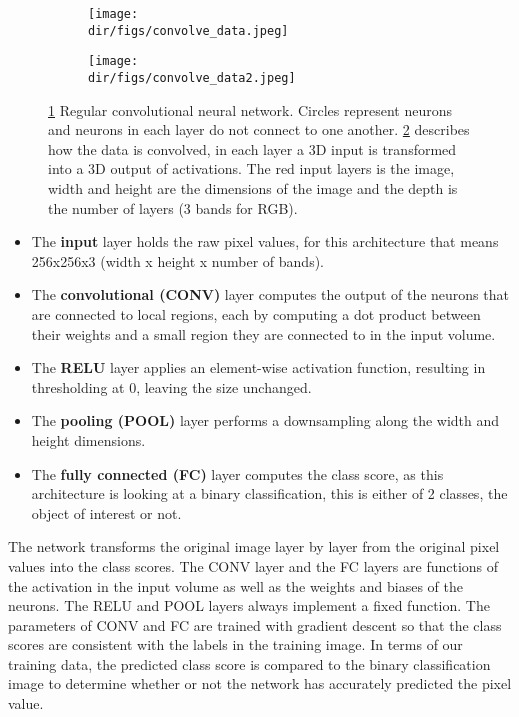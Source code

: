 \begin{figure}[H]
\centering
\begin{subfigure}{0.45\textwidth}
\texttt{[image: \\dir/figs/convolve\_data.jpeg]}
\caption{}
\label{fig.convolve_data1}
\end{subfigure}%
\qquad
\begin{subfigure}{0.45\textwidth}
\texttt{[image: \\dir/figs/convolve\_data2.jpeg]}
\caption{}
\label{fig.convolve_data2}
\end{subfigure}
\caption[Basic Convolutional Neural Network architecture]{\ref{fig.convolve_data1} Regular convolutional neural network. Circles represent neurons and neurons in each layer do not connect to one another. \ref{fig.convolve_data2} describes how the data is convolved, in each layer a 3D input is transformed into a 3D output of activations. The red input layers is the image, width and height are the dimensions of the image and the depth is the number of layers (3 bands for RGB).}
\label{fig.convolve_data}
\end{figure}

\begin{itemize}
    
    \item The \textbf{input} layer holds the raw pixel values, for this architecture that means 256x256x3 (width x height x number of bands).
    \item The \textbf{convolutional (CONV)} layer computes the output of the neurons that are connected to local regions, each by computing a dot product between their weights and a small region they are connected to in the input volume.
    \item The \textbf{RELU} layer applies an element-wise activation function, resulting in thresholding at 0, leaving the size unchanged.
    \item The \textbf{pooling (POOL)} layer performs a downsampling along the width and height dimensions.
    \item The \textbf{fully connected (FC)} layer computes the class score, as this architecture is looking at a binary classification, this is either of 2 classes, the object of interest or not. 
\end{itemize}
\par
The network transforms the original image layer by layer from the original pixel values into the class scores. The CONV layer and the FC layers are functions of the activation in the input volume as well as the weights and biases of the neurons. The RELU and POOL layers always implement a fixed function. The parameters of CONV and FC are trained with gradient descent so that the class scores are consistent with the labels in the training image. In terms of our training data, the predicted class score is compared to the binary classification image to determine whether or not the network has accurately predicted the pixel value.
\par
